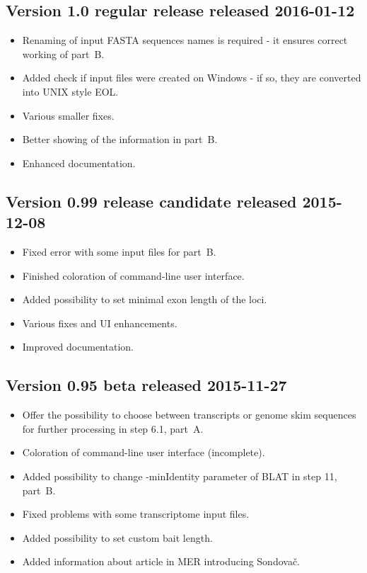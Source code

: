 \documentclass[a4paper, 11pt, twoside]{article}
\begin{document}
\subsection{Version 1.0 regular release released 2016-01-12}

\begin{itemize}
  \item Renaming of input FASTA sequences names is required - it ensures correct working of part~B.
  \item Added check if input files were created on Windows - if so, they are converted into UNIX style EOL.
  \item Various smaller fixes.
  \item Better showing of the information in part~B.
  \item Enhanced documentation.
\end{itemize}

\subsection{Version 0.99 release candidate released 2015-12-08}

\begin{itemize}
  \item Fixed error with some input files for part~B.
  \item Finished coloration of command-line user interface.
  \item Added possibility to set minimal exon length of the loci.
  \item Various fixes and UI enhancements.
  \item Improved documentation.
\end{itemize}

\subsection{Version 0.95 beta released 2015-11-27}

\begin{itemize}
  \item Offer the possibility to choose between transcripts or genome skim sequences for further processing in step 6.1, part~A.
  \item Coloration of command-line user interface (incomplete).
  \item Added possibility to change -minIdentity parameter of BLAT in step 11, part~B.
  \item Fixed problems with some transcriptome input files.
  \item Added possibility to set custom bait length.
  \item Added information about article in MER introducing Sondovač.
\end{itemize}
\end{document}
